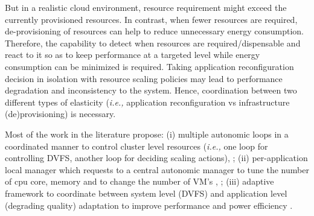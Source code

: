 But in a realistic cloud environment, resource requirement might exceed the currently provisioned resources. In contrast, when fewer resources are required, de-provisioning of resources can help to reduce unnecessary energy consumption. Therefore, the capability to detect when resources are required/dispensable and react to it so as to keep performance at a targeted level while energy consumption can be minimized is required. Taking application reconfiguration decision in isolation with resource scaling policies may lead to performance degradation and inconsistency to the system. Hence, coordination between two different types of elasticity (\emph{i.e.,} application reconfiguration vs infrastructure (de)provisioning) is necessary.

Most of the work in the literature propose: (i) multiple autonomic loops in a coordinated manner to control cluster level resources (\emph{i.e.,} one loop for controlling DVFS, another loop for deciding scaling actions)\cite{server-cluster}, \cite{shi}; (ii) per-application local manager which requests to a central autonomic manager to tune the number of cpu core, memory and to change the number of VM's \cite{morin1}, \cite{morin2}; (iii) adaptive framework to coordinate between system level (DVFS) and application level (degrading quality) adaptation to improve performance and power efficiency \cite{adaptcap}.

